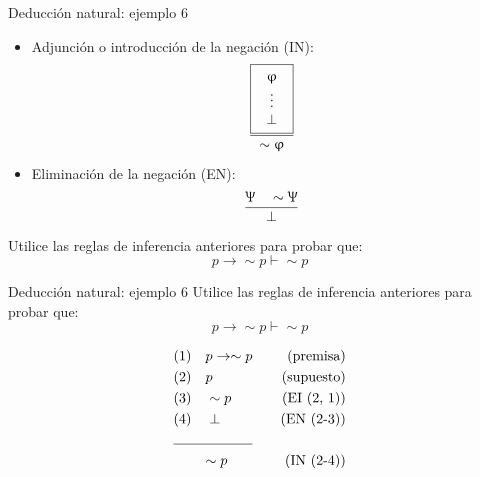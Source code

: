 \documentclass{beamer}
\begin{document}
\begin{frame}{Deducción natural: ejemplo 6}
  \begin{itemize}
    \item Adjunción o introducción de la negación (IN):
          \begin{equation*}
            \frac{
              \fbox{
                $\begin{array}{c}
                  \upvarphi \\
                  \vdots \\
                  \perp
                \end{array}$
              }
            }{\sim \upvarphi}
          \end{equation*}

    \item Eliminación de la negación (EN):
    $$\dfrac{\Uppsi \quad \sim \Uppsi}{\perp}$$

  \end{itemize}

  Utilice las reglas de inferencia anteriores para probar que:
  $$p \rightarrow \sim p \vdash \sim p$$
\end{frame}


\begin{frame}{Deducción natural: ejemplo 6}
  Utilice las reglas de inferencia anteriores para probar que:
  $$p \rightarrow \sim p \vdash \sim p$$

  \begin{align*}
    &(1) \quad p \rightarrow \sim p  & \quad (\text{premisa}) \\
    &(2) \quad p  & \quad (\text{supuesto}) \\
    &(3) \quad \sim p  & \quad (\text{EI (2, 1)}) \\
    &(4) \quad \perp  & \quad (\text{EN (2-3)}) \\
    \cline{1-2}
    & \qquad \sim p & \quad (\text{IN (2-4)})
  \end{align*}

\end{frame}
\end{document}
